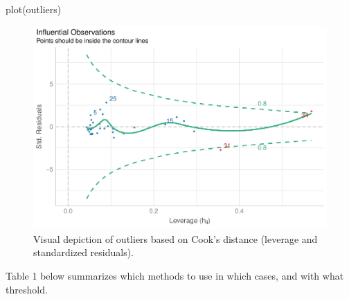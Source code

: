\documentclass[mathematics,article,submit,moreauthors,pdftex]{mdpi}
\newenvironment{Shaded}{\begin{snugshade}}{\end{snugshade}}
\newcommand{\FunctionTok}[1]{\textcolor[rgb]{0.00,0.00,0.00}{#1}}
\newcommand{\NormalTok}[1]{#1}
\begin{document}
\begin{Shaded}
\begin{Highlighting}[]
\FunctionTok{plot}\NormalTok{(outliers)}
\end{Highlighting}
\end{Shaded}

\begin{figure}
\includegraphics[width=1\linewidth]{paper_files/figure-latex/model-1} \caption{Visual depiction of outliers based on Cook's distance (leverage and standardized residuals).}\label{fig:model}
\end{figure}

Table 1 below summarizes which methods to use in which cases, and with
what threshold.
\end{document}
